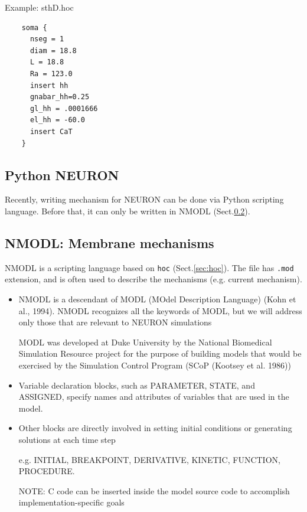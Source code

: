 \label{sec:hoc-example}
Example: sthD.hoc
\begin{verbatim}
    soma {
      nseg = 1
      diam = 18.8
      L = 18.8
      Ra = 123.0
      insert hh
      gnabar_hh=0.25
      gl_hh = .0001666
      el_hh = -60.0
      insert CaT
    }
\end{verbatim}


\subsection{Python NEURON}
\label{sec:NEURON-python}

Recently, writing mechanism for NEURON can be done via Python scripting
language. Before that, it can only be written in NMODL (Sect.\ref{sec:NMODL}).


\subsection{NMODL: Membrane mechanisms}
\label{sec:NMODL}

NMODL is a scripting language based on \verb!hoc! (Sect.\ref{sec:hoc}).
The file has \verb!.mod! extension, and is often used to describe the mechanisms
(e.g. current mechanism). 
\begin{itemize}
  \item NMODL is a descendant of MODL (MOdel Description Language) (Kohn et
  al., 1994). NMODL recognizes all the keywords of MODL, but we will address only
those that are relevant to NEURON simulations
  
  MODL was developed at Duke University by the National
Biomedical Simulation Resource project for the purpose of building models that
would be exercised by the Simulation Control Program (SCoP (Kootsey et al.
1986))
  
  \item Variable declaration blocks, such as PARAMETER, STATE, and ASSIGNED,
  specify names and attributes of variables that are used in the model.

   \item  Other blocks are directly involved in setting
initial conditions or generating solutions at each time step

e.g. INITIAL, BREAKPOINT, DERIVATIVE, KINETIC,
FUNCTION, PROCEDURE.

NOTE: C code can be inserted inside the
model source code to accomplish implementation-specific goals	

\end{itemize}



